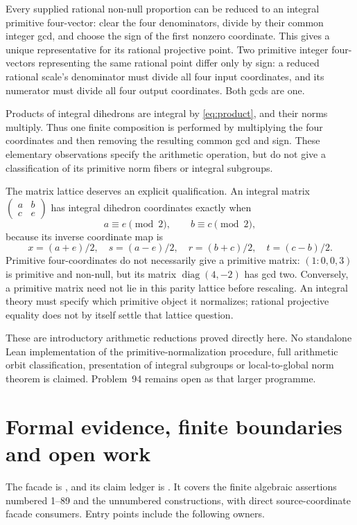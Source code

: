 \documentclass[11pt]{article}
\theoremstyle{remark}
\begin{document}
Every supplied rational non-null proportion can be reduced to an integral
primitive four-vector: clear the four denominators, divide by their common
integer gcd, and choose the sign of the first nonzero coordinate. This gives
a unique representative for its rational projective point. Two primitive
integer four-vectors representing the same rational point differ only by
sign: a reduced rational scale's denominator must divide all four input
coordinates, and its numerator must divide all four output coordinates.
Both gcds are one.

Products of integral dihedrons are integral by \eqref{eq:product}, and their
norms multiply. Thus one finite composition is performed by multiplying the
four coordinates and then removing the resulting common gcd and sign.
These elementary observations specify the arithmetic operation, but do not
give a classification of its primitive norm fibers or integral subgroups.

The matrix lattice deserves an explicit qualification. An integral matrix
\(\left(\begin{smallmatrix}a&b\\c&e\end{smallmatrix}\right)\)
has integral dihedron coordinates exactly when
\[
 a\equiv e\pmod2,\qquad b\equiv c\pmod2,
\]
because its inverse coordinate map is
\[
 x=(a+e)/2,\quad s=(a-e)/2,\quad
 r=(b+c)/2,\quad t=(c-b)/2.
\]
Primitive four-coordinates do not necessarily give a primitive matrix:
\((1:0,0,3)\) is primitive and non-null, but its matrix
\(\operatorname{diag}(4,-2)\) has gcd two. Conversely, a primitive matrix
need not lie in this parity lattice before rescaling. An integral theory must
specify which primitive object it normalizes; rational projective equality
does not by itself settle that lattice question.

These are introductory arithmetic reductions proved directly here. No
standalone Lean implementation of the primitive-normalization procedure,
full arithmetic orbit classification, presentation of integral subgroups or
local-to-global norm theorem is claimed. Problem~94 remains open as that
larger programme.

\section{Formal evidence, finite boundaries and open work}

The facade is
, and its
claim ledger is .
It covers the finite algebraic assertions numbered 1--89 and the unnumbered
constructions, with direct source-coordinate facade consumers. Entry points
include the following owners.
\end{document}
